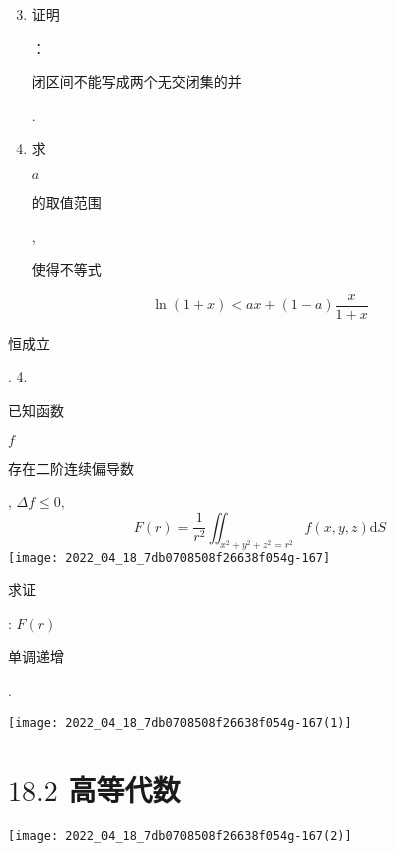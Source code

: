 \documentclass[10pt]{article}
\begin{document}
\begin{enumerate}
  \setcounter{enumi}{2}
  \item \begin{CJK}{UTF8}{mj}证明\end{CJK}：\begin{CJK}{UTF8}{mj}闭区间不能写成两个无交闭集的并\end{CJK}.

  \item \begin{CJK}{UTF8}{mj}求\end{CJK} $a$ \begin{CJK}{UTF8}{mj}的取值范围\end{CJK}, \begin{CJK}{UTF8}{mj}使得不等式\end{CJK}

\end{enumerate}
$$
\ln (1+x)<a x+(1-a) \frac{x}{1+x}
$$
\begin{CJK}{UTF8}{mj}恒成立\end{CJK}. 4. \begin{CJK}{UTF8}{mj}已知函数\end{CJK} $f$ \begin{CJK}{UTF8}{mj}存在二阶连续偏导数\end{CJK}, $\Delta f \leqslant 0$,
$$
F(r)=\frac{1}{r^{2}} \iint_{x^{2}+y^{2}+z^{2}=r^{2}} f(x, y, z) \mathrm{d} S
$$
\texttt{[image: 2022\_04\_18\_7db0708508f26638f054g-167]}

\begin{CJK}{UTF8}{mj}求证\end{CJK}: $F(r)$ \begin{CJK}{UTF8}{mj}单调递增\end{CJK}.

\texttt{[image: 2022\_04\_18\_7db0708508f26638f054g-167(1)]}

\section{$18.2$ 高等代数}
\texttt{[image: 2022\_04\_18\_7db0708508f26638f054g-167(2)]}
\end{document}
